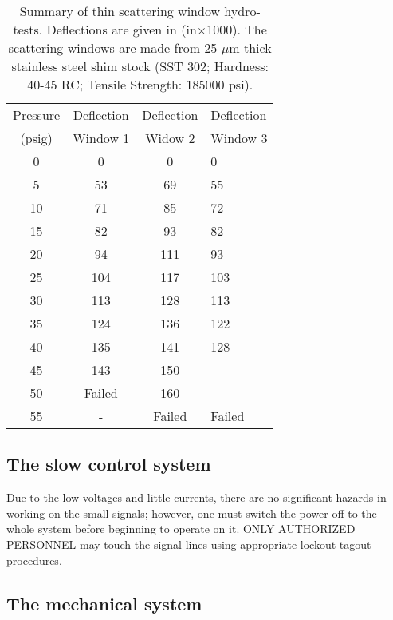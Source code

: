 {%
\begin{table}
\begin{center}\begin{tabular}{|c|c|c|p{2in}|}
\hline 
Pressure&
\multicolumn{1}{c|}{Deflection}&
\multicolumn{1}{c|}{Deflection}&
\multicolumn{1}{p{2in}|}{Deflection}\\
(psig)&
\multicolumn{1}{c|}{Window 1}&
Widow 2&
Window 3\\
\hline
\hline 
0&
0&
0&
0\\
\hline
5&
53&
69&
55\\
\hline
10&
71&
85&
72\\
\hline
15&
82&
93&
82\\
\hline
20&
94&
111&
93\\
\hline
25&
104&
117&
103\\
\hline
30&
113&
128&
113\\
\hline
35&
124&
136&
122\\
\hline
40&
135&
141&
128\\
\hline
45&
143&
150&
-\\
\hline
50&
Failed&
160&
-\\
\hline
55&
-&
Failed&
Failed\\
\hline
\end{tabular}\end{center}
\caption[Summary of thin scattering window hydro-tests]%
{Summary of thin scattering window hydro-tests. Deflections are given
in (in$\times $1000). The scattering windows are made from 25 $\mu $m
thick stainless steel shim stock (SST 302; Hardness: 40-45 RC; Tensile
Strength: 185000 psi). \label{tab: window-table}}
\end{table}



\begin{safetyen}{10}{10}
\subsection{The slow control system}
\end{safetyen}

Due to the low voltages and little currents, there are no significant
hazards in working on the small signals; however, one must switch
the power off to the whole system before beginning to operate on it.
ONLY AUTHORIZED PERSONNEL may touch the signal lines using appropriate
lockout tagout procedures.


\begin{safetyen}{10}{10}
\subsection{The mechanical system}
\end{safetyen}

}
